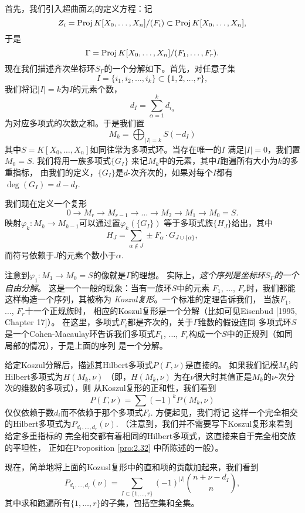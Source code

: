 首先，我们引入超曲面$Z_i$的定义方程：记
\[
	Z_i=\operatorname{Proj} K[X_0,\dots,X_n]/(F_i)\subset 
	\operatorname{Proj} K[X_0,\dots,X_n],
\]
于是
\[
	\Gamma=\operatorname{Proj} K[X_0,\dots,X_n]/(F_1,\dots,F_r).
\]
现在我们描述齐次坐标环$S_\Gamma$的一个分解如下。首先，对任意子集
\[
	I=\{i_1,i_2,\dots,i_k\}\subset \{1,2,\dots,r\},
\]
我们将记$|I|=k$为$I$的元素个数，
\[
	d_I=\sum_{\alpha=1}^k d_{i_\alpha}
\]
为对应多项式的次数之和。于是我们置
\[
	M_k=\bigoplus_{|I|=k}S(-d_I)
\]
其中$S=K[X_0,\dots,X_n]$如同往常为多项式环。当存在唯一的$I$
满足$|I|=0$，我们置$M_0=S$. 我们将用一族多项式$\{G_I\}$
来记$M_k$中的元素，其中$I$跑遍所有大小为$k$的多重指标，
由我们的定义，$\{G_I\}$是$d$-次齐次的，如果对每个$I$都有
$\deg(G_I)=d-d_I$.

我们现在定义一个复形
\[
	0\longrightarrow M_r\longrightarrow M_{r-1}
	 \longrightarrow \dots \longrightarrow M_2
	 \longrightarrow M_1\longrightarrow M_0=S.
\]
映射$\varphi_k:M_k\to M_{k-1}$可以通过置$\varphi_k(\{G_I\})$
等于多项式族$\{H_J\}$给出，其中
\[
	H_J=\sum_{\alpha\not\in J}\pm F_\alpha\cdot 
	G_{J\cup \{\alpha\}},
\]
而符号依赖于$J$的元素个数小于$\alpha$.

注意到$\varphi_1:M_1\to M_0=S$的像就是$\Gamma$的理想。
实际上，\textit{这个序列是坐标环$S_\Gamma$的一个自由分解}。
这是一个一般的现象：当有一族环$S$中的元素
$F_1$, $\dots$, $F_r$时，我们都能这样构造一个序列，其被称为
\textit{Koszul复形}。一个标准的定理告诉我们，
当族$F_1$, $\dots$, $F_r$十一个正规族时，
相应的Koszul复形是一个分解（比如可见Eisenbud [1995, Chapter 17]）。
在这里，多项式$F_i$都是齐次的，关于$\Gamma$维数的假设连同
多项式环$S$是一个Cohen-Macaulay环告诉我们多项式$F_1$, $\dots$,
$F_r$构成一个$S$中的正规列（如同局部的情况），于是上面的序列
是一个分解。


给定Koszul分解后，描述其Hilbert多项式$P(\Gamma,\nu)$是直接的。
如果我们记模$M_k$的Hilbert多项式为$H(M_k,\nu)$ （即，$H(M_k,\nu)$
为在$\nu$很大时其值正是$M_k$的$\nu$-次分次的维数的多项式），则
从Koszul复形的正和性，我们看到
\[
	P(\Gamma,\nu)=\sum (-1)^k P(M_k,\nu)
\]
仅仅依赖于数$d_i$而不依赖于那个多项式$F_i$. 方便起见，我们将记
这样一个完全相交的Hilbert多项式为$P_{d_1,\dots,d_r}(\nu)$.
（注意到，我们并不需要写下Koszul复形来看到给定多重指标的
完全相交都有着相同的Hilbert多项式，这直接来自于完全相交族的平坦性，
正如在Proposition \ref{pro:2.32} 中所陈述的一般）。

现在，简单地将上面的Kozusl复形中的直和项的贡献加起来，我们看到
\[
	P_{d_1,\dots,d_r}(\nu)
	=\sum_{I\subset \{1,\dots,r\}}(-1)^{|I|}
	\binom{n+\nu-d_I}{n},
\]
其中求和跑遍所有$\{1,\dots,r\}$的子集，包括空集和全集。

